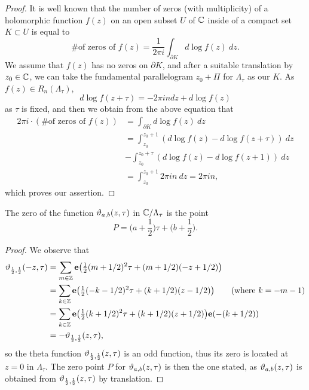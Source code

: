 \begin{proof}
	It is well known that the number of zeros (with multiplicity) of a holomorphic function $f(z)$ on an open subset $U$ of $\mathbb{C}$ inside of a compact set $K \subset U$ is equal to
	\begin{equation}
		\text{\# of zeros of } f(z) = \frac{1}{2\pi i}\int_{\partial K}d \log f(z)\ dz.
	\end{equation}
	We assume that $f(z)$ has no zeros on $\partial K$, and after a suitable translation by $z_{0}\in \mathbb{C}$, we can take the fundamental parallelogram $z_{0} + \Pi$ for $\Lambda_{\tau}$ as our $K$. As $f(z) \in R_{n}(\Lambda_{\tau})$,
	\begin{equation*}
		d\log f(z+\tau) = -2\pi indz + d\log f(z)
	\end{equation*}
	as $\tau$ is fixed, and then we obtain from the above equation that
	\begin{equation*}
		\begin{split}
		2\pi i\cdot(\text{\# of zeros of } f(z)) &= \int_{\partial K}d \log f(z)\ dz\\
		&= \int_{z_{0}}^{z_{0} + 1} (d \log f(z) - d\log f(z+\tau))\ dz\\
		&- \int_{z_{0}}^{z_{0} + \tau} (d \log f(z) - d\log f(z+1))\ dz\\
		&= \int_{z_{0}}^{z_{0} + 1} 2\pi in\ dz = 2\pi i n,
		\end{split}
	\end{equation*}
	which proves our assertion.
\end{proof}

\begin{lemma}
	\label{zero_point}
	The zero of the function $\vartheta_{a,b}(z,\tau)$ in $\mathbb{C}/\Lambda_{\tau}$ is the point
	\begin{equation}
		P = \bigg(a + \frac{1}{2}\bigg)\tau + \bigg(b + \frac{1}{2}\bigg).
	\end{equation}
\end{lemma}

\begin{proof}
	We observe that
	\begin{equation*}
		\begin{split}
		\vartheta_{\frac{1}{2},\frac{1}{2}}(-z,\tau) &= \sum_{m\in \mathbb{Z}}\mathbf{e}\big(\tfrac{1}{2}(m+1/2)^{2}\tau + (m+1/2)(-z+1/2)\big)\\
		&= \sum_{k\in \mathbb{Z}}\mathbf{e}\big(\tfrac{1}{2}(-k-1/2)^{2}\tau + (k+1/2)(z-1/2)\big) \qquad(\text{where }k = -m-1)\\
		&= \sum_{k\in \mathbb{Z}}\mathbf{e}\big(\tfrac{1}{2}(k+1/2)^{2}\tau + (k+1/2)(z+1/2)\big)\mathbf{e}(-(k+1/2))\\
		&= -\vartheta_{\frac{1}{2},\frac{1}{2}}(z,\tau),
		\end{split}
	\end{equation*}
	so the theta function $\vartheta_{\frac{1}{2},\frac{1}{2}}(z,\tau)$ is an odd function, thus its zero is located at $z=0$ in $\Lambda_{\tau}$. The zero point $P$ for $\vartheta_{a,b}(z,\tau)$ is then the one stated, as $\vartheta_{a,b}(z,\tau)$ is obtained from $\vartheta_{\frac{1}{2},\frac{1}{2}}(z,\tau)$ by translation.
\end{proof}

